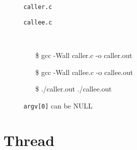 \begin{figure}
  \centering
  \begin{minipage}{.4\linewidth}
    \begin{center}
      \caption{\texttt{caller.c}}
    \end{center}
  \end{minipage}\qquad
  \begin{minipage}{.4\linewidth}
    \begin{center}
      \caption{\texttt{callee.c}}
    \end{center}
  \end{minipage}\\[1em]
  \ttfamily
  \begin{itemize}
  \item[\$] gcc -Wall caller.c -o caller.out
  \item[\$] gcc -Wall callee.c -o callee.out
  \item[\$] ./caller.out ./callee.out
  \end{itemize}
  \caption{\texttt{argv[0]} can be NULL}
  \label{fig:argv0}
\end{figure}




\section{Thread}
\label{sec:thread}

